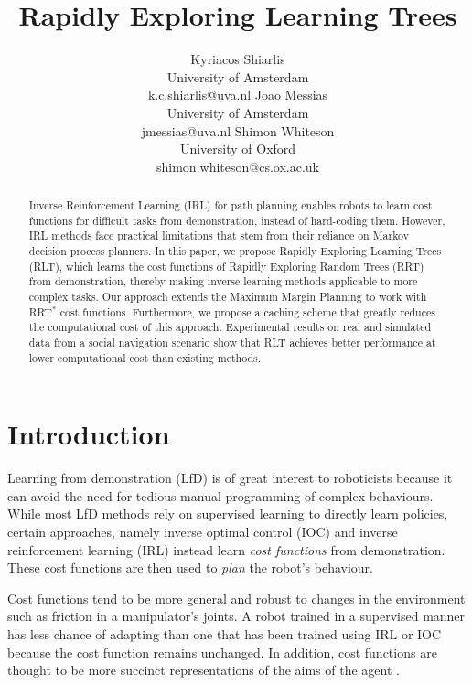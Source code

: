 \documentclass{article}  %
\title{\LARGE \bf
Rapidly Exploring Learning Trees
}
\author{Kyriacos Shiarlis \\
University of Amsterdam \\
k.c.shiarlis@uva.nl
\And 
Joao Messias \\
University of Amsterdam \\ 
jmessias@uva.nl 
\And
Shimon Whiteson \\
University of Oxford \\
shimon.whiteson@cs.ox.ac.uk 
}
\begin{document}
\maketitle
\thispagestyle{empty}
\pagestyle{empty}


\begin{abstract}
Inverse Reinforcement Learning (IRL) for path planning enables robots to learn cost functions for difficult tasks from demonstration, instead of hard-coding them. However, IRL methods face practical limitations that stem from their reliance on Markov decision process planners.
In this paper, we propose Rapidly Exploring Learning Trees (RLT), which learns the cost functions of Rapidly Exploring Random Trees (RRT) from demonstration, thereby making inverse learning methods applicable to more complex tasks. Our approach extends the Maximum Margin Planning to work with RRT$^*$ cost functions. Furthermore, we propose a caching scheme that greatly reduces the computational cost of this approach. Experimental results on real and simulated data from a social navigation scenario show that RLT achieves better performance at lower computational cost than existing methods.

\end{abstract}


\section{Introduction}

Learning from demonstration (LfD) \cite{argall2009survey} is of great interest to roboticists because it can avoid the need for tedious manual programming of complex behaviours. While most LfD methods rely on supervised learning to directly learn policies, certain approaches, namely inverse optimal control (IOC) \cite{kalman1964linear} and inverse reinforcement learning (IRL) \cite{abbeel2004apprenticeship} instead learn \emph{cost functions} from demonstration. These cost functions are then used to \emph{plan} the robot's behaviour. 

Cost functions tend to be more general and robust to changes in the environment such as friction in a manipulator's joints. A robot trained in a supervised manner has less chance of adapting than one that has been trained using IRL or IOC because the cost function remains unchanged. In addition, cost functions are thought to be more succinct representations of the aims of the agent \cite{abbeel2004apprenticeship}. %
\end{document}
